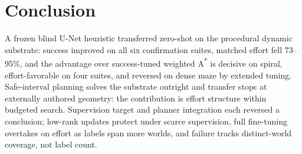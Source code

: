 \documentclass[letterpaper]{article} %
\begin{document}
\section{Conclusion}

A frozen blind U-Net heuristic transferred zero-shot on the procedural dynamic substrate: success improved on all six confirmation suites, matched effort fell 73--95\%, and the advantage over success-tuned weighted A\textsuperscript{*} is decisive on spiral, effort-favorable on four suites, and reversed on dense maze by extended tuning. Safe-interval planning solves the substrate outright and transfer stops at externally authored geometry: the contribution is effort structure within budgeted search. Supervision target and planner integration each reversed a conclusion; low-rank updates protect under scarce supervision, full fine-tuning overtakes on effort as labels span more worlds, and failure tracks distinct-world coverage, not label count.



\end{document}
